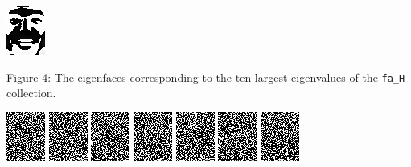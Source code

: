 \documentclass[ 12pt ]{article}
\begin{document}
\begin{enumerate}
\begin{enumerate}
\begin{center}
                    \includegraphics[scale=1.7]{AnyConv.com__largest10}
                \end{center}
                \begin{center}
                    \scriptsize
                    Figure 4: The eigenfaces corresponding to the ten largest eigenvalues of the \verb|fa_H| collection.
                \end{center}

                \begin{center}
                    \includegraphics[scale=1.7]{AnyConv.com__smallest1}
                    \includegraphics[scale=1.7]{AnyConv.com__smallest2}
                    \includegraphics[scale=1.7]{AnyConv.com__smallest3}
                    \includegraphics[scale=1.7]{AnyConv.com__smallest4}
                    \includegraphics[scale=1.7]{AnyConv.com__smallest5}
                    \includegraphics[scale=1.7]{AnyConv.com__smallest6}
                    \includegraphics[scale=1.7]{AnyConv.com__smallest7}

\end{center}
\end{enumerate}
\end{enumerate}
\end{document}
